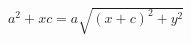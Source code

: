 \documentclass[preview]{standalone}
\begin{document}
\begin{align*}
a^2 + xc = a \sqrt{(x+c)^2+y^2}
\end{align*}
\end{document}
